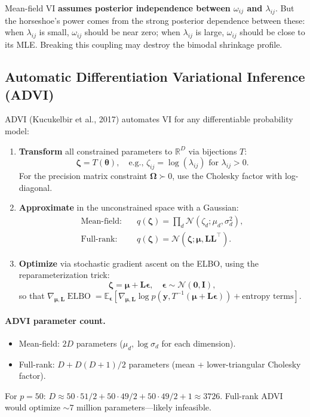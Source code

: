 \documentclass[11pt,a4paper]{article}
\newcommand{\R}{\mathbb{R}}
\newcommand{\E}{\mathbb{E}}
\newcommand{\ELBO}{\operatorname{ELBO}}
\newcommand{\Normal}{\mathcal{N}}
\newcommand{\bOmega}{\bm{\Omega}}
\begin{document}
\begin{warning}
Mean-field VI \textbf{assumes posterior independence between $\omega_{ij}$ and $\lambda_{ij}$}. But the horseshoe's power comes from the strong posterior dependence between these: when $\lambda_{ij}$ is small, $\omega_{ij}$ should be near zero; when $\lambda_{ij}$ is large, $\omega_{ij}$ should be close to its MLE. Breaking this coupling may destroy the bimodal shrinkage profile.
\end{warning}

\subsection{Automatic Differentiation Variational Inference (ADVI)}

ADVI (Kucukelbir et al., 2017) automates VI for any differentiable probability model:

\begin{enumerate}
  \item \textbf{Transform} all constrained parameters to $\R^D$ via bijections $T$:
  \begin{equation}
    \bm{\zeta} = T(\bm{\theta}), \quad \text{e.g., } \zeta_{ij} = \log(\lambda_{ij})\text{ for }\lambda_{ij} > 0.
  \end{equation}
  For the precision matrix constraint $\bOmega \succ 0$, use the Cholesky factor with log-diagonal.

  \item \textbf{Approximate} in the unconstrained space with a Gaussian:
  \begin{align}
    \text{Mean-field:} &\quad q(\bm{\zeta}) = \prod_d \Normal(\zeta_d; \mu_d, \sigma_d^2), \\
    \text{Full-rank:} &\quad q(\bm{\zeta}) = \Normal(\bm{\zeta}; \bm{\mu}, \bm{L}\bm{L}^\top).
  \end{align}

  \item \textbf{Optimize} via stochastic gradient ascent on the ELBO, using the reparameterization trick:
  \begin{equation}
    \bm{\zeta} = \bm{\mu} + \bm{L}\bm{\epsilon}, \quad \bm{\epsilon} \sim \Normal(\bm{0},\bm{I}),
  \end{equation}
  so that $\nabla_{\bm{\mu},\bm{L}}\ELBO = \E_{\bm{\epsilon}}[\nabla_{\bm{\mu},\bm{L}}\log p(\bm{y},T^{-1}(\bm{\mu}+\bm{L}\bm{\epsilon})) + \text{entropy terms}]$.
\end{enumerate}

\paragraph{ADVI parameter count.}
\begin{itemize}[nosep]
  \item Mean-field: $2D$ parameters ($\mu_d, \log\sigma_d$ for each dimension).
  \item Full-rank: $D + D(D+1)/2$ parameters (mean + lower-triangular Cholesky factor).
\end{itemize}
For $p=50$: $D \approx 50\cdot51/2 + 50\cdot49/2 + 50\cdot49/2 + 1 \approx 3726$. Full-rank ADVI would optimize $\sim 7$ million parameters---likely infeasible.
\end{document}
